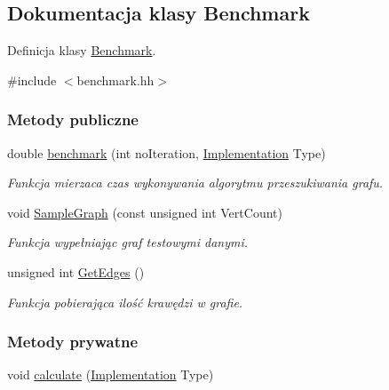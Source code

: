 \hypertarget{class_benchmark}{\subsection{Dokumentacja klasy Benchmark}
\label{class_benchmark}
}


Definicja klasy \hyperlink{class_benchmark}{Benchmark}.  




{\ttfamily \#include $<$benchmark.\-hh$>$}

\subsubsection*{Metody publiczne}
\begin{DoxyCompactItemize}
\item 
double \hyperlink{class_benchmark_a57c68b02b4ba13025b215015e15cc5d5}{benchmark} (int no\-Iteration, \hyperlink{benchmark_8hh_a9107acb389f0886054bea6298a73e191}{Implementation} Type)
\begin{DoxyCompactList}\small\item\em Funkcja mierzaca czas wykonywania algorytmu przeszukiwania grafu. \end{DoxyCompactList}\item 
void \hyperlink{class_benchmark_adbc1291287334b25aca2ee3c1bc0eca5}{Sample\-Graph} (const unsigned int Vert\-Count)
\begin{DoxyCompactList}\small\item\em Funkcja wypełniając graf testowymi danymi. \end{DoxyCompactList}\item 
unsigned int \hyperlink{class_benchmark_a5b1abbabfe55827274ad0c90c772530d}{Get\-Edges} ()
\begin{DoxyCompactList}\small\item\em Funkcja pobierająca ilość krawędzi w grafie. \end{DoxyCompactList}\end{DoxyCompactItemize}
\subsubsection*{Metody prywatne}
\begin{DoxyCompactItemize}
\item 
void \hyperlink{class_benchmark_a7605d948d3931f722e50dcda55475860}{calculate} (\hyperlink{benchmark_8hh_a9107acb389f0886054bea6298a73e191}{Implementation} Type)
\end{DoxyCompactItemize}
